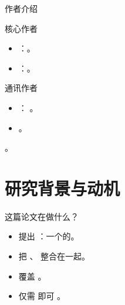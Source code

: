 \begin{frame}{作者介绍}
  \begin{block}{核心作者}
    \begin{itemize}
      \item {}：。
      \item {}：。
    \end{itemize}
  \end{block}
  \tightgap
  \begin{block}{通讯作者}
    \begin{itemize}
      \item {}： 。
      \item {}。
    \end{itemize}
  \end{block}
  \tightgap
  \begin{callout}[研究脉络]
    。
  \end{callout}
\end{frame}

\renewcommand{\secblurb}{\ph{本节一句话主旨：本文要解决的问题与核心贡献}}
\section{研究背景与动机}

\begin{frame}{这篇论文在做什么？}
  \begin{itemize}
    \item 提出 ：一个的。
    \item 把 、 整合在一起。
    \item 覆盖 。
    \item 仅需  即可 。
  \end{itemize}
  \deckgap
  \centering
  \hfill
  \hfill
\end{frame}


